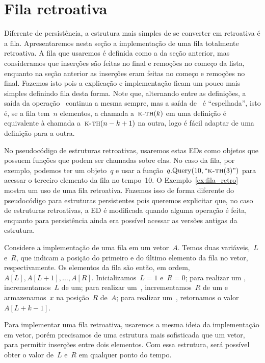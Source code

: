\documentclass[quali.tex]{subfile}
\begin{document}
\section{Fila retroativa} \label{sec:fila_retro}

Diferente de persistência, a estrutura mais simples de se converter em retroativa é a fila. Apresentaremos nesta seção a implementação de uma fila totalmente retroativa. A fila que usaremos é definida como a da seção anterior, mas consideramos que inserções são feitas no final e remoções no começo da lista, enquanto na seção anterior as inserções eram feitas no começo e remoções no final. Fazemos isto pois a explicação e implementação ficam um pouco mais simples definindo fila desta forma. Note que, alternando entre as definições, a saída da operação~ continua a mesma sempre, mas a saída de~ é ``espelhada'', isto é, se a fila tem~$n$ elementos, a chamada a~$\Call{k-th}{k}$ em uma definição é equivalente à chamada a~$\Call{k-th}{n-k+1}$ na outra, logo é fácil adaptar de uma definição para a outra.

No pseudocódigo de estruturas retroativas, usaremos estas EDs como objetos que possuem funções que podem ser chamadas sobre elas. No caso da fila, por exemplo, podemos ter um objeto~$q$ e usar a função~$q.\text{Query}(10, ``\textsc{k-th}(3)")$ para acessar o terceiro elemento da fila no tempo~10. O Exemplo~\ref{ex:fila_retro} mostra um uso de uma fila retroativa. Fazemos isso de forma diferente do pseudocódigo para estruturas persistentes pois queremos explicitar que, no caso de estruturas retroativas, a ED é modificada quando alguma operação é feita, enquanto para persistência ainda era possível acessar as versões antigas da estrutura.

Considere a implementação de uma fila em um vetor~$A$. Temos duas variáveis,~$L$ e~$R$, que indicam a posição do primeiro e do último elemento da fila no vetor, respectivamente. Os elementos da fila são então, em ordem,~$A[L], A[L + 1], \ldots, A[R]$. Inicializamos~$L = 1$ e~$R = 0$; para realizar um , incrementamos~$L$ de um; para realizar um~, incrementamos~$R$ de um e armazenamos~$x$ na posição~$R$ de~$A$; para realizar um~, retornamos o valor~$A[L + k - 1]$.

Para implementar uma fila retroativa, usaremos a mesma ideia da implementação em vetor, porém precisamos de uma estrutura mais sofisticada que um vetor, para permitir inserções entre dois elementos. Com essa estrutura, será possível obter o valor de~$L$ e~$R$ em qualquer ponto do tempo.
\end{document}
